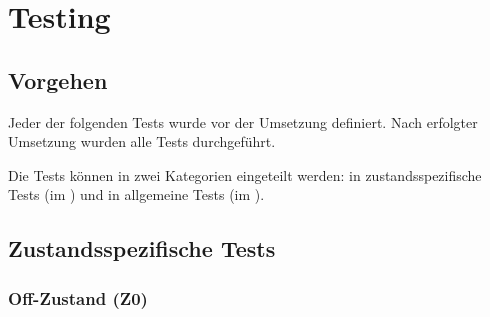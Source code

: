 \chapter{Testing}
\label{chap:testing}


\section{Vorgehen}
Jeder der folgenden Tests wurde vor der Umsetzung definiert.
Nach erfolgter Umsetzung wurden alle Tests durchgeführt.

Die Tests können in zwei Kategorien eingeteilt werden: in zustandsspezifische Tests (im ) und in allgemeine Tests (im ).

\section{Zustandsspezifische Tests}
\label{sec:stateSpecificTest}
\subsection{Off-Zustand (Z0)}
